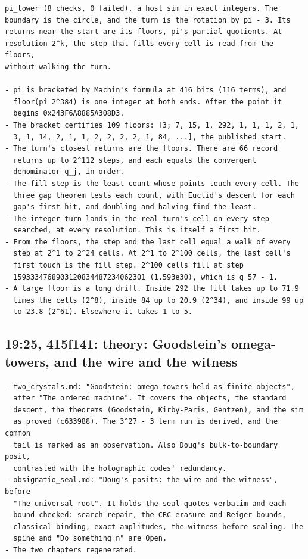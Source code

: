 \begin{Verbatim}
pi_tower (8 checks, 0 failed), a host sim in exact integers. The
boundary is the circle, and the turn is the rotation by pi - 3. Its
returns near the start are its floors, pi's partial quotients. At
resolution 2^k, the step that fills every cell is read from the floors,
without walking the turn.

- pi is bracketed by Machin's formula at 416 bits (116 terms), and
  floor(pi 2^384) is one integer at both ends. After the point it
  begins 0x243F6A8885A308D3.
- The bracket certifies 109 floors: [3; 7, 15, 1, 292, 1, 1, 1, 2, 1,
  3, 1, 14, 2, 1, 1, 2, 2, 2, 2, 1, 84, ...], the published start.
- The turn's closest returns are the floors. There are 66 record
  returns up to 2^112 steps, and each equals the convergent
  denominator q_j, in order.
- The fill step is the least count whose points touch every cell. The
  three gap theorem tests each count, with Euclid's descent for each
  gap's first hit, and doubling and halving find the least.
- The integer turn lands in the real turn's cell on every step
  searched, at every resolution. This is itself a first hit.
- From the floors, the step and the last cell equal a walk of every
  step at 2^1 to 2^24 cells. At 2^1 to 2^100 cells, the last cell's
  first touch is the fill step. 2^100 cells fill at step
  1593334768903120834487234062301 (1.593e30), which is q_57 - 1.
- A large floor is a long drift. Inside 292 the fill takes up to 71.9
  times the cells (2^8), inside 84 up to 20.9 (2^34), and inside 99 up
  to 23.8 (2^61). Elsewhere it takes 1 to 5.
\end{Verbatim}

\subsection{\texorpdfstring{19:25, 415f141: theory: Goodstein's omega-towers, and the wire and the witness}{19:25, 415f141: theory: Goodstein's omega-towers, and the wire and the witness}}

\begin{Verbatim}
- two_crystals.md: "Goodstein: omega-towers held as finite objects",
  after "The ordered machine". It covers the objects, the standard
  descent, the theorems (Goodstein, Kirby-Paris, Gentzen), and the sim
  as proved (c633988). The 3^27 - 3 term run is derived, and the common
  tail is marked as an observation. Also Doug's bulk-to-boundary posit,
  contrasted with the holographic codes' redundancy.
- obsignatio_seal.md: "Doug's posits: the wire and the witness", before
  "The universal root". It holds the seal quotes verbatim and each
  bound checked: search repair, the CRC erasure and Reiger bounds,
  classical binding, exact amplitudes, the witness before sealing. The
  spine and "Do something n" are Open.
- The two chapters regenerated.
\end{Verbatim}

